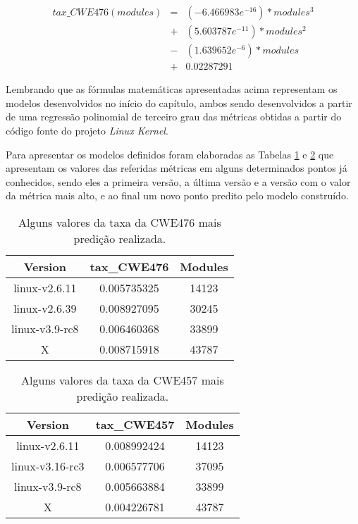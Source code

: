 \begin{align*}
 tax\_CWE476(modules) &=& (-6.466983e^{-16}) * modules^{3} \\
                      &+& (5.603787e^{-11}) * modules^{2} \\
                      &-& (1.639652e^{-6}) * modules \\
                      &+& 0.02287291
\end{align*}

Lembrando que as fórmulas matemáticas apresentadas acima representam os modelos
desenvolvidos no início do capítulo, ambos sendo desenvolvidos a
partir de uma regressão polinomial de terceiro grau das métricas obtidas a
partir do código fonte do projeto \textit{Linux Kernel}.

Para apresentar os modelos definidos foram elaboradas as Tabelas
\ref{tab:cwe476} e \ref{tab:cwe457} que apresentam os valores das referidas
métricas em alguns determinados pontos já conhecidos, sendo eles a primeira
versão, a última versão e a versão com o valor da métrica mais alto, e ao final
um novo ponto predito pelo modelo construído.

\begin{table}[h]
\centering
\begin{tabular}{ccc}
\hline
\rowcolor[HTML]{EFEFEF} 
{Version}  & {tax\_CWE476} & {Modules} \\ \hline
linux-v2.6.11  & 0.005735325       & 14123         \\ \hline
linux-v2.6.39  & 0.008927095       & 30245         \\ \hline
linux-v3.9-rc8 & 0.006460368       & 33899         \\ \hline
X              & 0.008715918       & 43787         \\ \hline
\end{tabular}
\caption{Alguns valores da taxa da CWE476 mais predição realizada.}
\label{tab:cwe476}
\end{table}

\begin{table}[h]
\centering
\begin{tabular}{ccc}
\hline
\rowcolor[HTML]{EFEFEF} 
{Version}   & {tax\_CWE457} & {Modules} \\ \hline
linux-v2.6.11   & 0.008992424       & 14123         \\ \hline
linux-v3.16-rc3 & 0.006577706       & 37095         \\ \hline
linux-v3.9-rc8  & 0.005663884       & 33899         \\ \hline
X               & 0.004226781       & 43787         \\ \hline
\end{tabular}
\caption{Alguns valores da taxa da CWE457 mais predição realizada.}
\label{tab:cwe457}
\end{table}

